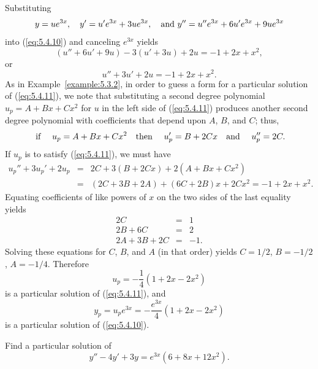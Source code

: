 \begin{examplesolution}
\solution Substituting
\[
  y=ue^{3x},\quad y'=u'e^{3x}+3ue^{3x},\mbox{\quad and }y''=u''e^{3x}+6u'e^{3x}+9ue^{3x}
\]
into (\ref{eq:5.4.10}) and canceling $e^{3x}$ yields
\[
  (u''+6u'+9u)-3(u'+3u)+2u=-1+2x+x^{2},
\]
or
\begin{equation}
  \label{eq:5.4.11}u''+3u'+2u=-1+2x+x^{2}.
\end{equation}
As in Example~\ref{example:5.3.2}, in order to guess a form for a particular solution of
(\ref{eq:5.4.11}), we note that substituting a second degree polynomial $u_{p}=A+Bx+Cx^{2}$ for $u$
in the left side of (\ref{eq:5.4.11}) produces another second degree polynomial with coefficients
that depend upon $A$, $B$, and $C$; thus,
\[
  \mbox{ if \quad}u_{p}=A+Bx+Cx^{2}\mbox{\quad then \quad}u_{p}'=B+2Cx\mbox{\quad and \quad}u_{p}''=2C.
\]
If $u_{p}$ is to satisfy (\ref{eq:5.4.11}), we must have
\begin{eqnarray*}
  u_{p}''+3u_{p}'+2u_{p} & = & 2C+3(B+2Cx)+2(A+Bx+Cx^{2}) \\
                         & = & (2C+3B+2A)+(6C+2B)x+2Cx^{2}=-1+2x+x^{2}.
\end{eqnarray*}
Equating coefficients of like powers of $x$ on the two sides of the last equality yields
\[
  \begin{array}{rcr}
    2C       & = & 1\phantom{.} \\
    2B+6C    & = & 2\phantom{.} \\
    2A+3B+2C & = & -1.
  \end{array}
\]
Solving these equations for $C$, $B$, and $A$ (in that order) yields $C=1/2$, $B=-1/2$, $A=-1/4$.
Therefore
\[
  u_{p}=-\frac{1}{4}(1+2x-2x^{2})
\]
is a particular solution of (\ref{eq:5.4.11}), and
\[
  y_{p}=u_{p}e^{3x}=-\frac{e^{3x}}{4}(1+2x-2x^{2})
\]
is a particular solution of (\ref{eq:5.4.10}).
\end{examplesolution}

\begin{example}
  \label{example:5.4.5} \rm Find a particular solution of
  \begin{equation}
    \label{eq:5.4.12}y''-4y'+3y=e^{3x}(6+8x+12x^{2}).
  \end{equation}
\end{example}

